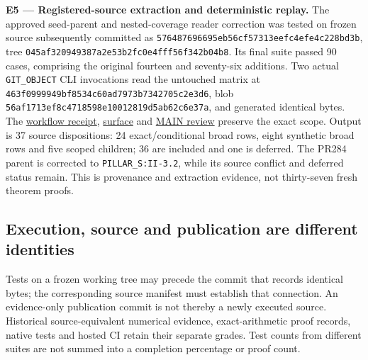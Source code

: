 \documentclass[
  11pt,
  a4paper]{article}
\begin{document}
\textbf{E5 --- Registered-source extraction and deterministic replay.} The approved seed-parent and nested-coverage reader correction was tested on frozen source subsequently committed as {\ttfamily\nolinkurl{576487696695eb56cf57313eefc4efe4c228bd3b}}, tree {\ttfamily\nolinkurl{045af320949387a2e53b2fc0e4fff56f342b04b8}}. Its final suite passed 90 cases, comprising the original fourteen and seventy-six additions. Two actual \texttt{GIT\_OBJECT} CLI invocations read the untouched matrix at {\ttfamily\nolinkurl{463f0999949bf8534c60ad7973b7342705c2e3d6}}, blob {\ttfamily\nolinkurl{56af1713ef8c4718598e10012819d5ab62c6e37a}}, and generated identical bytes. The \href{https://github.com/cosmosapjw-quantum/htt_base/blob/09857c15e2a42bd747188a89f08e4a0fde0aaae4/artifacts/research_reports/pr450_seed_coverage_repair_HTT_PR450_SEED_COVERAGE_REPAIR_R1_20260907T014908Z/EXECUTION_RECEIPT.json}{workflow receipt}, \href{https://github.com/cosmosapjw-quantum/htt_base/blob/09857c15e2a42bd747188a89f08e4a0fde0aaae4/artifacts/research_reports/pr450_seed_coverage_repair_HTT_PR450_SEED_COVERAGE_REPAIR_R1_20260907T014908Z/REGISTERED_SURVIVOR_SURFACE.json}{surface} and \href{https://github.com/cosmosapjw-quantum/htt_base/pull/458\#issuecomment-5564296516}{MAIN review} preserve the exact scope. Output is 37 source dispositions: 24 exact/conditional broad rows, eight synthetic broad rows and five scoped children; 36 are included and one is deferred. The PR284 parent is corrected to \texttt{PILLAR\_S:II-3.2}, while its source conflict and deferred status remain. This is provenance and extraction evidence, not thirty-seven fresh theorem proofs.

\hypertarget{b.3-execution-source-and-publication-are-different-identities}{%
\subsection{Execution, source and publication are different identities}\label{b.3-execution-source-and-publication-are-different-identities}}

Tests on a frozen working tree may precede the commit that records identical bytes; the corresponding source manifest must establish that connection. An evidence-only publication commit is not thereby a newly executed source. Historical source-equivalent numerical evidence, exact-arithmetic proof records, native tests and hosted CI retain their separate grades. Test counts from different suites are not summed into a completion percentage or proof count.
\end{document}
